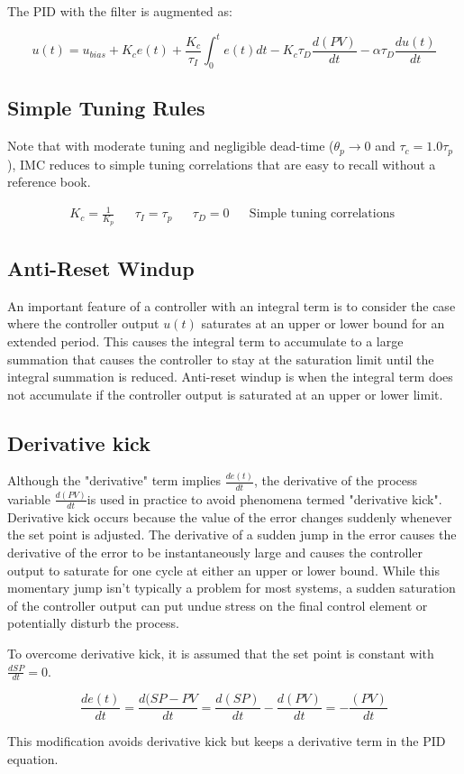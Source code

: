 The PID with the filter is augmented as:

\[    u(t) = u_{bias} + K_c e(t) + \frac{K_c}{\tau_I} \int_{0}^{t} e(t) dt - K_c \tau_D \frac{d(PV)}{dt} - \alpha \tau_D \frac{du(t)}{dt} \]

\subsection{Simple Tuning Rules}
Note that with moderate tuning and negligible dead-time ($\theta_p \rightarrow	 0$ and $\tau_c = 1.0\tau_p$), IMC reduces to simple tuning correlations that are easy to recall without a reference book. 

\begin{align*}
K_c = \frac{1}{K_p} && \tau_I = \tau_p && \tau_D = 0 && \text{Simple tuning correlations }
\end{align*}

\subsection{Anti-Reset Windup}
An important feature of a controller with an integral term is to consider the case where the controller output $u(t)$ saturates at an upper or lower bound for an extended period. This causes the integral term to accumulate to a large summation that causes the controller to stay at the saturation limit until the integral summation is reduced. Anti-reset windup is when the integral term does not accumulate if the controller output is saturated at an upper or lower limit. 

\subsection{Derivative kick}

Although the "derivative" term implies $\frac{ d e(t)}{d t}$, the derivative of the process variable $\frac{d (PV)}{d t}$is used in practice to avoid phenomena termed "derivative kick". Derivative kick occurs because the value of the error changes suddenly whenever the set point is adjusted. The derivative of a sudden jump in the error causes the derivative of the error to be instantaneously large and causes the controller output to saturate for one cycle at either an upper or lower bound. While this momentary jump isn't typically a problem for most systems, a sudden saturation of the controller output can put undue stress on the final control element or potentially disturb the process. 

To overcome derivative kick, it is assumed that the set point is constant with $\frac{d SP}{d t} = 0$.

\[ \frac{d e(t)}{d t} = \frac{d (SP - PV}{d t} = \frac{d (SP)}{d t} - \frac{d (PV)}{d t} = - \frac{(PV)}{d t} \]

This modification avoids derivative kick but keeps a derivative term in the PID equation. 